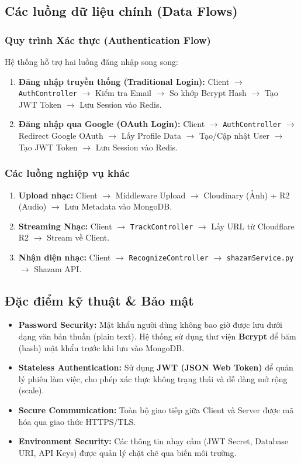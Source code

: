 \subsection{Các luồng dữ liệu chính (Data Flows)}

\subsubsection{Quy trình Xác thực (Authentication Flow)}
Hệ thống hỗ trợ hai luồng đăng nhập song song:
\begin{enumerate}
    \item \textbf{Đăng nhập truyền thống (Traditional Login):} Client $\rightarrow$ \texttt{AuthController} $\rightarrow$ Kiểm tra Email $\rightarrow$ So khớp Bcrypt Hash $\rightarrow$ Tạo JWT Token $\rightarrow$ Lưu Session vào Redis.
    \item \textbf{Đăng nhập qua Google (OAuth Login):} Client $\rightarrow$ \texttt{AuthController} $\rightarrow$ Redirect Google OAuth $\rightarrow$ Lấy Profile Data $\rightarrow$ Tạo/Cập nhật User $\rightarrow$ Tạo JWT Token $\rightarrow$ Lưu Session vào Redis.
\end{enumerate}

\subsubsection{Các luồng nghiệp vụ khác}
\begin{enumerate}
    \item \textbf{Upload nhạc:} Client $\rightarrow$ Middleware Upload $\rightarrow$ Cloudinary (Ảnh) + R2 (Audio) $\rightarrow$ Lưu Metadata vào MongoDB.
    \item \textbf{Streaming Nhạc:} Client $\rightarrow$ \texttt{TrackController} $\rightarrow$ Lấy URL từ Cloudflare R2 $\rightarrow$ Stream về Client.
    \item \textbf{Nhận diện nhạc:} Client $\rightarrow$ \texttt{RecognizeController} $\rightarrow$ \texttt{shazamService.py} $\rightarrow$ Shazam API.
\end{enumerate}

\subsection{Đặc điểm kỹ thuật \& Bảo mật}
\begin{itemize}
    \item \textbf{Password Security:} Mật khẩu người dùng không bao giờ được lưu dưới dạng văn bản thuần (plain text). Hệ thống sử dụng thư viện \textbf{Bcrypt} để băm (hash) mật khẩu trước khi lưu vào MongoDB.
    \item \textbf{Stateless Authentication:} Sử dụng \textbf{JWT (JSON Web Token)} để quản lý phiên làm việc, cho phép xác thực không trạng thái và dễ dàng mở rộng (scale).
    \item \textbf{Secure Communication:} Toàn bộ giao tiếp giữa Client và Server được mã hóa qua giao thức HTTPS/TLS.
    \item \textbf{Environment Security:} Các thông tin nhạy cảm (JWT Secret, Database URI, API Keys) được quản lý chặt chẽ qua biến môi trường.
\end{itemize}